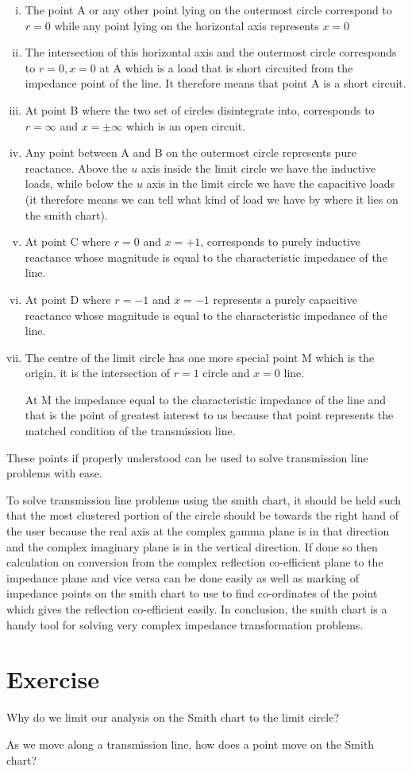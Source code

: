 \begin{enumerate}[(i)]
\item The point A or any other point lying on the outermost circle correspond to $r = 0$ while any point lying on the horizontal axis represents $x = 0$

\item The intersection of this horizontal axis and the outermost circle corresponds to $r = 0,x = 0$ at A which is a load that is short circuited from the impedance point of the line. It therefore means that point A is a short circuit.

\item At point B where the two set of circles disintegrate into, corresponds to $r = \infty$ and $x = \pm\infty $ which is an open circuit.

\item Any point between A and B on the outermost circle represents pure reactance. Above the $u$ axis inside the limit circle we have the inductive loads, while below the $u$ axis in the limit circle we have the capacitive loads (it therefore means we can tell what kind of load we have by where it lies on the smith chart).

\item At point C where $r = 0$ and $x = +1$, corresponds to purely inductive reactance whose magnitude is equal to the characteristic impedance of the line.

\item At point D where $r = -1$ and $x = -1$ represents a purely capacitive reactance whose magnitude is equal to the characteristic impedance of the line.

\item The centre of the limit circle has one more special point M which is the origin, it is the intersection of $r = 1$ circle and $x = 0$ line.

At M the impedance equal to the characteristic impedance of the line and that is the point of greatest interest to us because that point represents the matched condition of the transmission line.
\end{enumerate}
These points if properly understood can be used to solve transmission line problems with ease.

To solve transmission line problems using the smith chart, it should be held such that the most clustered portion of the circle should be towards the right hand of the user because the real axis at the complex gamma plane is in that direction and the complex imaginary plane is in the vertical direction. If done so then calculation on conversion from the complex reflection co-efficient plane to the impedance plane and vice versa can be done easily as well as marking of impedance points on the smith chart to use to find co-ordinates of the point which gives the reflection co-efficient easily. In conclusion, the smith chart is a handy tool for solving very complex impedance transformation problems.

\section*{Exercise}
\begin{ExerciseList}
\Exercise[label={ex71}]
Why do we limit our analysis on the Smith chart to the limit circle?

\Exercise[label={ex72}]
As we move along a transmission line, how does a point move on the Smith chart?
\end{ExerciseList}